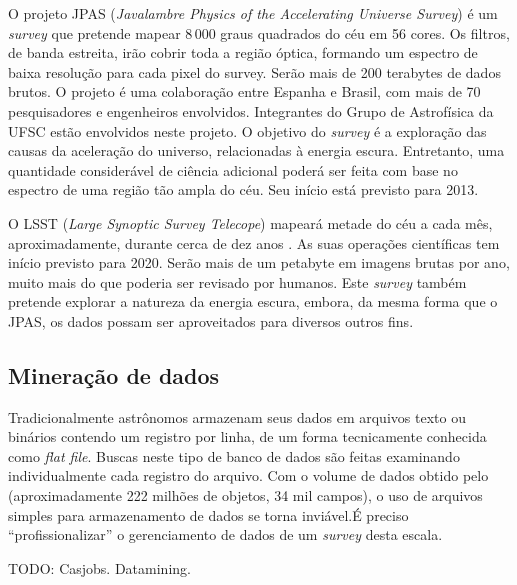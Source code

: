 O projeto JPAS ({\em Javalambre Physics of the Accelerating Universe Survey}) é
um {\em survey} que pretende mapear $8\,000$ graus quadrados do céu em 56
cores\citep{Benitez2009}. Os filtros, de banda estreita, irão cobrir toda a
região óptica, formando um espectro de baixa resolução para cada pixel do
survey. Serão mais de 200 terabytes de dados brutos\citneed. O projeto é uma
colaboração entre Espanha e Brasil, com mais de 70 pesquisadores e engenheiros
envolvidos. Integrantes do Grupo de Astrofísica da UFSC estão envolvidos neste
projeto\citneed. O objetivo do {\em survey} é a exploração das causas da
aceleração do universo, relacionadas à energia escura. Entretanto, uma
quantidade considerável de ciência adicional poderá ser feita com base no
espectro de uma região tão ampla do céu. Seu início está previsto para 2013.

O LSST ({\em Large Synoptic Survey Telecope}) mapeará metade do céu a cada mês,
aproximadamente, durante cerca de dez anos \citep{Ivezic2008}. As suas operações
científicas tem início previsto para 2020. Serão mais de um petabyte em imagens
brutas por ano, muito mais do que poderia ser revisado por humanos. Este {\em
survey} também pretende explorar a natureza da energia escura, embora, da mesma
forma que o JPAS, os dados possam ser aproveitados para diversos outros fins.

\subsection{Mineração de dados}

Tradicionalmente astrônomos armazenam seus dados em arquivos texto ou binários
contendo um registro por linha, de um forma tecnicamente conhecida como {\em
flat file}. Buscas neste tipo de banco de dados são feitas examinando
individualmente cada registro do arquivo. Com o volume de dados obtido pelo
\galex (aproximadamente 222 milhões de objetos, 34 mil campos), o uso de
arquivos simples para armazenamento de dados se torna inviável.\citneed É
preciso ``profissionalizar'' o gerenciamento de dados de um {\em survey} desta
escala.

TODO: Casjobs. Datamining.



